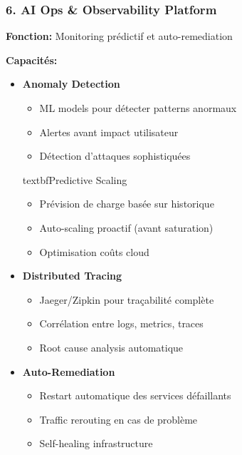 \documentclass[12pt,a4paper]{article}
\begin{document}
\subsubsection{6. AI Ops \& Observability Platform}

\begin{tcolorbox}[colback=green!5,colframe=green!50!black,title=\textbf{Nouveau Composant: AI Ops Platform}]

\textbf{Fonction:} Monitoring prédictif et auto-remediation

\textbf{Capacités:}
\begin{itemize}[noitemsep]
    \item \textbf{Anomaly Detection}
    \begin{itemize}[noitemsep]
        \item ML models pour détecter patterns anormaux
        \item Alertes avant impact utilisateur
        \item Détection d'attaques sophistiquées
    \end{itemize}
textbf{Predictive Scaling}
    \begin{itemize}[noitemsep]
        \item Prévision de charge basée sur historique
        \item Auto-scaling proactif (avant saturation)
        \item Optimisation coûts cloud
    \end{itemize}
    
    \item \textbf{Distributed Tracing}
    \begin{itemize}[noitemsep]
        \item Jaeger/Zipkin pour traçabilité complète
        \item Corrélation entre logs, metrics, traces
        \item Root cause analysis automatique
    \end{itemize}
    
    \item \textbf{Auto-Remediation}
    \begin{itemize}[noitemsep]
        \item Restart automatique des services défaillants
        \item Traffic rerouting en cas de problème
        \item Self-healing infrastructure
    \end{itemize}
\end{itemize}


\end{tcolorbox}
\end{document}
